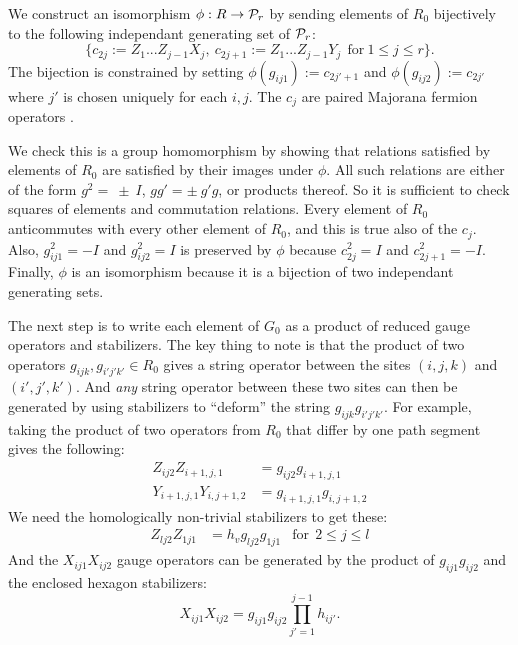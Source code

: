 \documentclass[12pt]{article}
\begin{document}
We construct an isomorphism $\phi: R\to \mathcal{P}_r$
by sending elements of $R_0$ bijectively
to the following independant generating
set of $\mathcal{P}_r$:
$$
\big\{c_{2j}:=Z_1...Z_{j-1} X_j,\ c_{2j+1}:=Z_1...Z_{j-1} Y_j\ \ \mbox{for}\ 1\le j\le r\big\}.
$$
The bijection is constrained 
by setting $\phi(g_{ij1}):=c_{2j'+1}$
and $\phi(g_{ij2}):=c_{2j'}$
where $j'$ is chosen uniquely for each $i, j.$
The $c_j$ are paired Majorana fermion operators \cite{Kitaev2006}.


We check this is a group homomorphism by showing that relations
satisfied by elements of $R_0$ are satisfied by
their images under $\phi.$
All such relations are either of the form
$g^2=~\pm~I$, $gg'=\pm~g'g$, or
products thereof.
So it is sufficient to check squares of
elements and commutation relations.
Every element of $R_0$ anticommutes with
every other element of $R_0$, and this is true also
of the $c_j.$
Also, $g_{ij1}^2=-I$ and $g_{ij2}^2=I$ 
is preserved by $\phi$ because $c_{2j}^2=I$ and $c_{2j+1}^2=-I$.
Finally, $\phi$ is an isomorphism
because it is a bijection of two independant
generating sets.

The next step is to write each element of $G_0$
as a product of reduced gauge operators and stabilizers.
The key thing to note is that the product of two
operators $g_{ijk}, g_{i'j'k'}\in R_0$ gives a string
operator between the sites $(i,j,k)$ and $(i',j',k')$.
And {\it any} string operator between these
two sites can then be generated by using stabilizers to
``deform'' the string $g_{ijk}g_{i'j'k'}.$
For example, taking the product
of two operators from $R_0$ that differ
by one path segment gives the following:
\begin{align*}
Z_{ij2}Z_{i+1,j,1} &= g_{ij2} g_{i+1,j,1} \\
Y_{i+1,j,1}Y_{i,j+1,2} &= g_{i+1,j,1}g_{i,j+1,2}
\end{align*}
We need the homologically non-trivial stabilizers to get these:
\begin{align*}
Z_{lj2}Z_{1j1} &= h_v g_{lj2} g_{1j1} &\mbox{for}\ \  2\le j\le l
\end{align*}
And the $X_{ij1}X_{ij2}$
gauge operators can be generated
by the product of 
$g_{ij1}g_{ij2}$ and the enclosed hexagon stabilizers:
$$X_{ij1}X_{ij2}=g_{ij1}g_{ij2}\prod_{j'=1}^{j-1} h_{ij'}.$$
\end{document}
